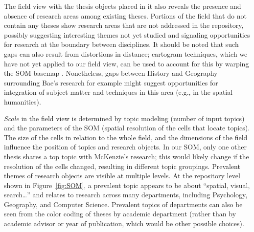 \documentclass[a4paper,UKenglish]{lipics-v2018}
\begin{document}
The field view with the thesis objects placed in it also reveals the presence and absence of research areas among existing theses. Portions of the field that do not contain any theses show research areas that are not addressed in the repository, possibly suggesting interesting themes not yet studied and signaling opportunities for research at the boundary between disciplines. It should be noted that such gaps can also result from distortions in distance; cartogram techniques, which we have not yet applied to our field view, can be used to account for this by warping the SOM basemap \cite{Bruggmann2016b}. Nonetheless, gaps between History and Geography surrounding Bae’s research for example might suggest opportunities for integration of subject matter and techniques in this area (e.g., in the spatial humanities). 

\textit{Scale} in the field view is determined by topic modeling (number of input topics) and the parameters of the SOM (spatial resolution of the cells that locate topics). The size of the cells in relation to the whole field, and the dimensions of the field influence the position of topics and research objects. In our SOM, only one other thesis shares a top topic with McKenzie’s research; this would likely change if the resolution of the cells changed, resulting in different topic groupings. Prevalent themes of research objects are visible at multiple levels. At the repository level shown in Figure~\ref{fig:SOM}, a prevalent topic appears to be about
“spatial, visual, search…” and relates to research across many departments, including Psychology, Geography, and Computer Science. Prevalent topics of departments can also be seen from the color coding of theses by academic department (rather than by academic advisor or year of publication, which would be other possible choices).

\end{document}
